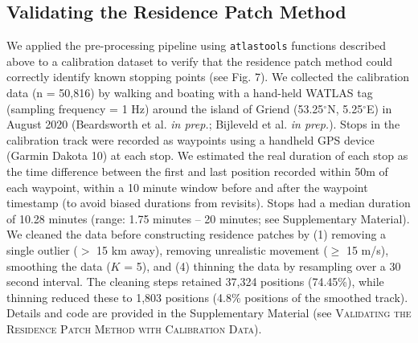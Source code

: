 \documentclass[10pt,paper=a4,headings=standardclasses
]{scrartcl}
\begin{document}
\subsection{Validating the Residence Patch Method}

We applied the pre-processing pipeline using \texttt{atlastools} functions described above to a calibration dataset to verify that the residence patch method could correctly identify known stopping points (see Fig. 7).
We collected the calibration data (n = 50,816) by walking and boating with a hand-held WATLAS tag (sampling frequency = 1 Hz) around the island of Griend (53.25$^{\circ}$N, 5.25$^{\circ}$E) in August 2020 (Beardsworth et al. \textit{in prep.}; Bijleveld et al. \textit{in prep.}).
Stops in the calibration track were recorded as waypoints using a handheld GPS device (Garmin Dakota 10) at each stop.
We estimated the real duration of each stop as the time difference between the first and last position recorded within 50m of each waypoint, within a 10 minute window before and after the waypoint timestamp (to avoid biased durations from revisits).
Stops had a median duration of 10.28 minutes (range: 1.75 minutes -- 20 minutes; see Supplementary Material).
We cleaned the data before constructing residence patches by (1) removing a single outlier ($>$ 15 km away), removing unrealistic movement ($\geq$ 15 m/s), smoothing the data ($K$ = 5), and (4) thinning the data by resampling over a 30 second interval.
The cleaning steps retained 37,324 positions (74.45\%), while thinning reduced these to 1,803 positions (4.8\% positions of the smoothed track).
Details and code are provided in the Supplementary Material (see \textsc{Validating the Residence Patch Method with Calibration Data}).

\end{document}
